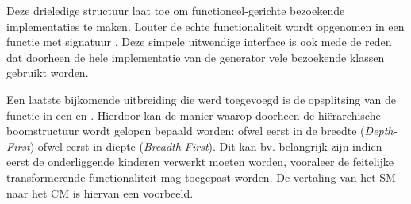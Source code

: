 Deze drieledige structuur laat toe om functioneel-gerichte bezoekende
implementaties te maken. Louter de echte functionaliteit wordt opgenomen in een
functie met signatuur . Deze simpele uitwendige interface
is ook mede de reden dat doorheen de hele implementatie van de generator vele
bezoekende klassen gebruikt worden.

Een laatste bijkomende uitbreiding die werd toegevoegd is de opsplitsing van de
 functie in een  en
. Hierdoor kan de manier waarop doorheen de
hi\"erarchische boomstructuur wordt gelopen bepaald worden: ofwel eerst in de
breedte (\emph{Depth-First}) ofwel eerst in diepte (\emph{Breadth-First}). Dit
kan bv. belangrijk zijn indien eerst de onderliggende kinderen verwerkt moeten
worden, vooraleer de feitelijke transformerende functionaliteit mag toegepast
worden. De vertaling van het SM naar het CM is hiervan een voorbeeld.

